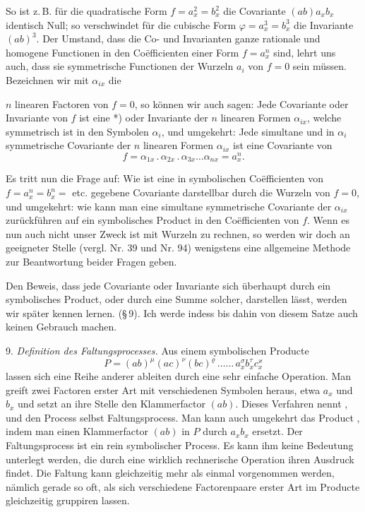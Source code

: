 \documentclass[11pt]{article}
\providecommand{\gesperrt}[1]{\textls[130]{#1}}
\providecommand{\weberpage}[1]{}
\begin{document}
So ist z.\,B. für die quadratische Form $f = a_x^2 = b_x^2$ die
Covariante $(ab) a_x b_x$ identisch Null; so verschwindet für die
cubische Form $\varphi = a_x^3 = b_x^3$ die Invariante $(ab)^3$. Der
Umstand, dass die Co- und Invarianten ganze rationale und homogene
Functionen in den Co\"efficienten einer Form $f = a_x^n$ sind, lehrt
uns auch, dass sie symmetrische Functionen der Wurzeln $a_i$ von
$f = 0$ sein müssen. Bezeichnen wir mit $\alpha_{ix}$ die


\weberpage{10}
$n$ linearen Factoren von $f = 0$, so können wir auch sagen: Jede
Covariante oder Invariante von $f$ ist eine \gesperrt{simultane
Covariante}*) oder Invariante der $n$ linearen Formen $\alpha_{ix}$,
welche symmetrisch ist in den Symbolen $\alpha_i$, und umgekehrt:
Jede simultane und in $\alpha_i$ symmetrische Covariante der $n$
linearen Formen $\alpha_{ix}$ ist eine Covariante von
\[
f = \alpha_{1x} \,.\, \alpha_{2x} \,.\, \alpha_{3x} \dots \alpha_{nx} = a_x^n .
\]

Es tritt nun die Frage auf: Wie ist eine in symbolischen
Co\"efficienten von $f = a_x^n = b_x^n = $ etc. gegebene Covariante
darstellbar durch die Wurzeln von $f = 0$, und umgekehrt: wie kann man
eine simultane symmetrische Covariante der $\alpha_{ix}$ zurückführen
auf ein symbolisches Product in den Co\"efficienten von $f$. Wenn es
nun auch nicht unser Zweck ist mit Wurzeln zu rechnen, so werden wir
doch an geeigneter Stelle (vergl. Nr. 39 und Nr. 94) wenigstens eine
allgemeine Methode zur Beantwortung beider Fragen geben.

Den Beweis, dass jede Covariante oder Invariante sich überhaupt durch
ein symbolisches Product, oder durch eine Summe solcher, darstellen
lässt, werden wir später kennen lernen. (\S\,9). Ich werde indess bis
dahin von diesem Satze auch keinen Gebrauch machen.

9. \textit{Definition des Faltungsprocesses.} Aus einem symbolischen
Producte
\[
P = (ab)^\mu (ac)^\nu (bc)^\varrho \, \dots\dots \, a_x^\sigma b_x^\tau c_x^\varkappa
\]
lassen sich eine Reihe anderer ableiten durch eine sehr einfache
Operation. Man greift zwei Factoren erster Art mit verschiedenen
Symbolen heraus, etwa $a_x$ und $b_x$ und setzt an ihre Stelle den
Klammerfactor $(ab)$. Dieses Verfahren nennt \gesperrt{Gordan}
\gesperrt{falten}, und den Process selbst \glqq Faltungsprocess\grqq{}.
Man kann auch umgekehrt das Product \gesperrt{entfalten}, indem man
einen Klammerfactor $(ab)$ in $P$ durch $a_x b_x$ ersetzt. Der
Faltungsprocess ist ein rein symbolischer Process. Es kann ihm keine
Bedeutung unterlegt werden, die durch eine wirklich rechnerische
Operation ihren Ausdruck findet. Die Faltung kann gleichzeitig mehr
als einmal vorgenommen werden, nämlich gerade so oft, als sich
verschiedene Factorenpaare erster Art im Producte gleichzeitig
gruppiren lassen.
\end{document}
